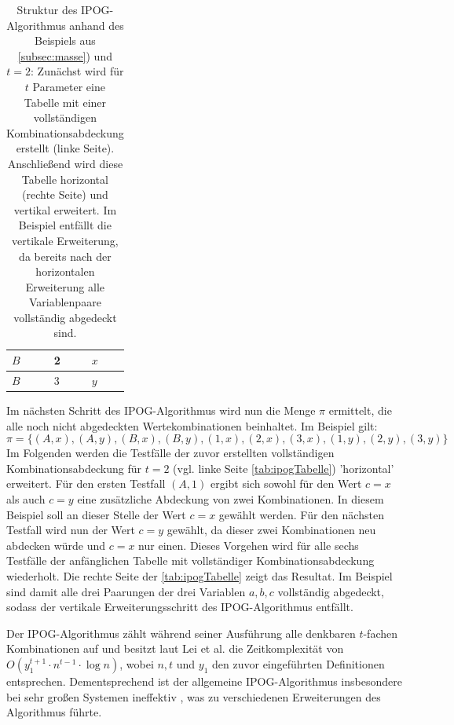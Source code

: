 \begin{table}[!htb]
\begin{minipage}{0.25\linewidth}
\begin{tabular}{|l|l|l|}
			$B$ & 2 & $x$ \\ \hline
			$B$ & 3 & $y$ \\ \hline
		\end{tabular}
    \end{minipage} 
    \caption{Struktur des IPOG-Algorithmus anhand des Beispiels aus \autoref{subsec:masse}) und $t=2$: Zunächst wird für $t$ Parameter eine Tabelle mit einer vollständigen Kombinationsabdeckung erstellt (linke Seite). Anschließend wird diese Tabelle horizontal (rechte Seite) und vertikal erweitert. Im Beispiel entfällt die vertikale Erweiterung, da bereits nach der horizontalen Erweiterung alle Variablenpaare vollständig abgedeckt sind.}
	\label{tab:ipogTabelle}
\end{table}

Im nächsten Schritt des IPOG-Algorithmus wird nun die Menge $\pi$ ermittelt, die alle noch nicht abgedeckten Wertekombinationen beinhaltet. Im Beispiel gilt: \[\pi = \{(A,x), (A,y), (B,x), (B,y), (1,x), (2,x), (3,x), (1,y), (2,y), (3,y)\}\]
Im Folgenden werden die Testfälle der zuvor erstellten vollständigen Kombinationsabdeckung für $t=2$ (vgl. linke Seite \autoref{tab:ipogTabelle}) 'horizontal' erweitert. Für den ersten Testfall $(A,1)$ ergibt sich sowohl für den Wert $c=x$ als auch $c=y$ eine zusätzliche Abdeckung von zwei Kombinationen. In diesem Beispiel soll an dieser Stelle der Wert $c=x$ gewählt werden. Für den nächsten Testfall wird nun der Wert $c=y$ gewählt, da dieser zwei Kombinationen neu abdecken würde und $c=x$ nur einen. Dieses Vorgehen wird für alle sechs Testfälle der anfänglichen Tabelle mit vollständiger Kombinationsabdeckung wiederholt. Die rechte Seite der \autoref{tab:ipogTabelle} zeigt das Resultat. Im Beispiel sind damit alle drei Paarungen der drei Variablen $a,b,c$ vollständig abgedeckt, sodass der vertikale Erweiterungsschritt des IPOG-Algorithmus entfällt.


\hspace{1cm} Der IPOG-Algorithmus zählt während seiner Ausführung alle denkbaren $t$-fachen Kombinationen auf und besitzt laut Lei et al. \cite{lei2008ipog} die Zeitkomplexität von $ O(y_1^{t+1} \cdot n^{t-1} \cdot \log n)$, wobei $n, t$ und $y_1$ den zuvor eingeführten Definitionen entsprechen. Dementsprechend ist der allgemeine IPOG-Algorithmus insbesondere bei sehr großen Systemen ineffektiv \cite{lei2008ipog}, was zu verschiedenen Erweiterungen des Algorithmus führte. 

